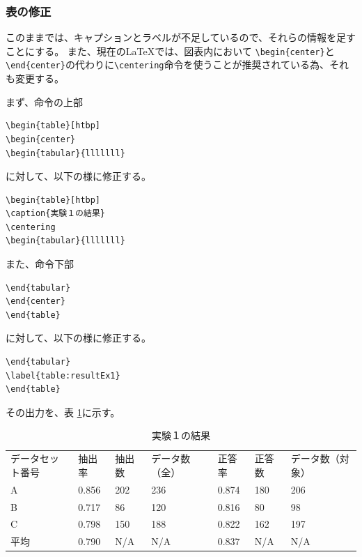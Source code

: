 \subsubsection{表の修正}
このままでは、キャプションとラベルが不足しているので、それらの情報を足すことにする。
また、現在の\LaTeX では、図表内において \verb+\begin{center}+と\verb+\end{center}+の代わりに\verb+\centering+命令を使うことが推奨されている為、それも変更する。

まず、命令の上部
\begin{breakbox}
{\small
\begin{verbatim}
\begin{table}[htbp]
\begin{center}
\begin{tabular}{lllllll}
\end{verbatim}
}
\end{breakbox}
に対して、以下の様に修正する。
\begin{breakbox}
{\small
\begin{verbatim}
\begin{table}[htbp]
\caption{実験１の結果}
\centering
\begin{tabular}{lllllll}
\end{verbatim}
}
\end{breakbox}

また、命令下部
\begin{breakbox}
{\small
\begin{verbatim}
\end{tabular}
\end{center}
\end{table}
\end{verbatim}
}
\end{breakbox}
に対して、以下の様に修正する。
\begin{breakbox}
{\small
\begin{verbatim}
\end{tabular}
\label{table:resultEx1}
\end{table}
\end{verbatim}
}
\end{breakbox}


その出力を、表 \ref{table:resultEx1a}に示す。
\begin{table}[H]
\caption{実験１の結果}
\centering
\begin{tabular}{lllllll}
データセット番号 & 抽出率 & 抽出数 & データ数（全） & 正答率 & 正答数 & データ数（対象）\\
A & 0.856 & 202 & 236 & 0.874 & 180 & 206\\
B & 0.717 & 86 & 120 & 0.816 & 80 & 98\\
C & 0.798 & 150 & 188 & 0.822 & 162 & 197\\
平均 & 0.790 & N/A & N/A & 0.837 & N/A & N/A\\
\end{tabular}
\label{table:resultEx1a}
\end{table}


